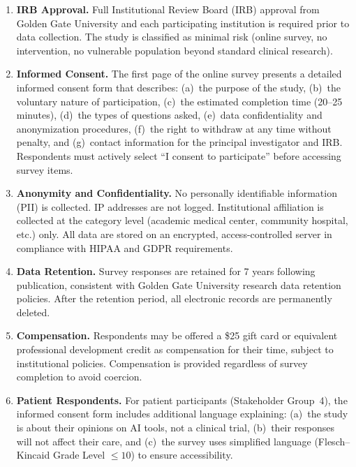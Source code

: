 \begin{enumerate}
    \item \textbf{IRB Approval.} Full Institutional Review Board (IRB) approval from Golden Gate University and each participating institution is required prior to data collection. The study is classified as minimal risk (online survey, no intervention, no vulnerable population beyond standard clinical research).

    \item \textbf{Informed Consent.} The first page of the online survey presents a detailed informed consent form that describes: (a)~the purpose of the study, (b)~the voluntary nature of participation, (c)~the estimated completion time (20--25 minutes), (d)~the types of questions asked, (e)~data confidentiality and anonymization procedures, (f)~the right to withdraw at any time without penalty, and (g)~contact information for the principal investigator and IRB. Respondents must actively select ``I consent to participate'' before accessing survey items.

    \item \textbf{Anonymity and Confidentiality.} No personally identifiable information (PII) is collected. IP addresses are not logged. Institutional affiliation is collected at the category level (academic medical center, community hospital, etc.) only. All data are stored on an encrypted, access-controlled server in compliance with HIPAA and GDPR requirements.

    \item \textbf{Data Retention.} Survey responses are retained for 7 years following publication, consistent with Golden Gate University research data retention policies. After the retention period, all electronic records are permanently deleted.

    \item \textbf{Compensation.} Respondents may be offered a \$25 gift card or equivalent professional development credit as compensation for their time, subject to institutional policies. Compensation is provided regardless of survey completion to avoid coercion.

    \item \textbf{Patient Respondents.} For patient participants (Stakeholder Group~4), the informed consent form includes additional language explaining: (a)~the study is about their opinions on AI tools, not a clinical trial, (b)~their responses will not affect their care, and (c)~the survey uses simplified language (Flesch--Kincaid Grade Level $\leq 10$) to ensure accessibility.
\end{enumerate}

